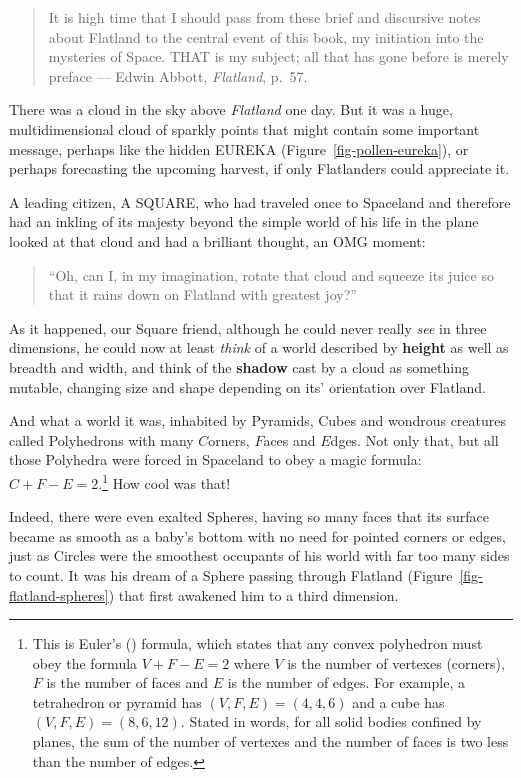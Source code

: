 \documentclass[
  letterpaper,
  10pt,
  krantz2]{krantz}
\begin{document}
\begin{quote}
It is high time that I should pass from these brief and discursive notes
about Flatland to the central event of this book, my initiation into the
mysteries of Space. THAT is my subject; all that has gone before is
merely preface --- Edwin Abbott, \emph{Flatland}, p.~57.
\end{quote}

There was a cloud in the sky above \emph{Flatland} one day. But it was a
huge, multidimensional cloud of sparkly points that might contain some
important message, perhaps like the hidden EUREKA
(Figure~\ref{fig-pollen-eureka}), or perhaps forecasting the upcoming
harvest, if only Flatlanders could appreciate it.

A leading citizen, A SQUARE, who had traveled once to Spaceland and
therefore had an inkling of its majesty beyond the simple world of his
life in the plane looked at that cloud and had a brilliant thought, an
OMG moment:

\begin{quote}
``Oh, can I, in my imagination, rotate that cloud and squeeze its juice
so that it rains down on Flatland with greatest joy?''
\end{quote}

As it happened, our Square friend, although he could never really
\emph{see} in three dimensions, he could now at least \emph{think} of a
world described by \textbf{height} as well as breadth and width, and
think of the \textbf{shadow} cast by a cloud as something mutable,
changing size and shape depending on its' orientation over Flatland.

And what a world it was, inhabited by Pyramids, Cubes and wondrous
creatures called Polyhedrons with many \(C\)orners, \(F\)aces and
\(E\)dges. Not only that, but all those Polyhedra were forced in
Spaceland to obey a magic formula: \(C + F - E = 2\).\footnote{This is
  Euler's () formula, which states that
  any convex polyhedron must obey the formula \(V + F - E = 2\) where
  \(V\) is the number of vertexes (corners), \(F\) is the number of
  faces and \(E\) is the number of edges. For example, a tetrahedron or
  pyramid has \((V, F, E) = (4, 4, 6)\) and a cube has
  \((V, F, E) = (8, 6, 12)\). Stated in words, for all solid bodies
  confined by planes, the sum of the number of vertexes and the number
  of faces is two less than the number of edges.} How cool was that!

Indeed, there were even exalted Spheres, having so many faces that its
surface became as smooth as a baby's bottom with no need for pointed
corners or edges, just as Circles were the smoothest occupants of his
world with far too many sides to count. It was his dream of a Sphere
passing through Flatland (Figure~\ref{fig-flatland-spheres}) that first
awakened him to a third dimension.
\end{document}
